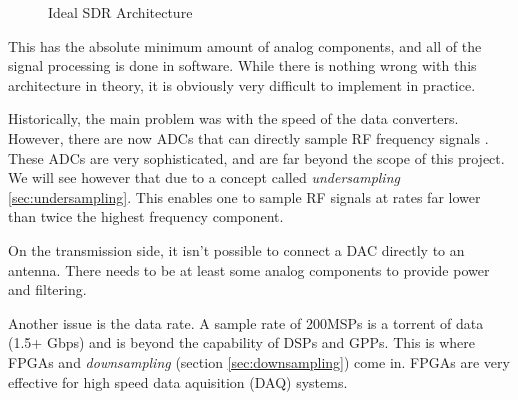 \documentclass[a4paper, 12pt, notitlepage]{article}
\begin{document}
\begin{figure}[ht]
\caption{Ideal SDR Architecture}
\label{fig:ideal_sdr}
\centering
{}
\end{figure}

This has the absolute minimum amount of analog components, and all of the signal processing is done in software.  While there is nothing wrong with this architecture in theory, it is obviously very difficult to implement in practice.  

Historically, the main problem was with the speed of the data converters.  However, there are now ADCs that can directly sample RF frequency signals \cite{gsps_adc}.  These ADCs are very sophisticated, and are far beyond the scope of this project.  We will see however that due to a concept called \textit{undersampling} \ref{sec:undersampling}.  This enables one to sample RF signals at rates far lower than twice the highest frequency component.

On the transmission side, it isn't possible to connect a DAC directly to an antenna.  There needs to be at least some analog components to provide power and filtering.

Another issue is the data rate.  A sample rate of 200MSPs is a torrent of data (1.5+ Gbps) and is beyond the capability of DSPs and GPPs.  This is where FPGAs and \textit{downsampling} (section \ref{sec:downsampling}) come in.  FPGAs are very effective for high speed data aquisition (DAQ) systems.
\end{document}
